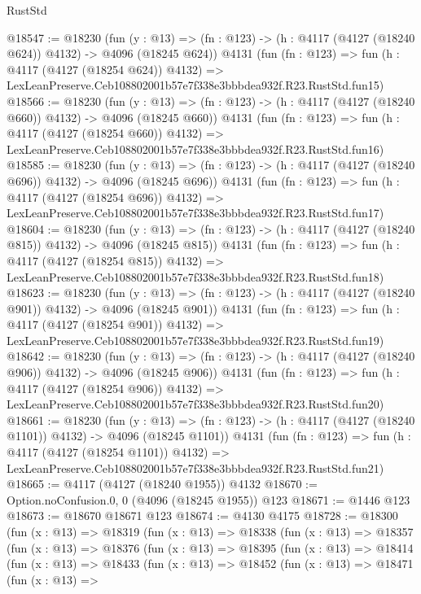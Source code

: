 \begin{lexlean}{RustStd}
\begin{coremodule}
@18547 := @18230
    (fun (y : @13) => (fn : @123) -> (h : @4117 (@4127 (@18240 @624)) @4132) -> @4096 (@18245 @624))
    @4131
    (fun (fn : @123) =>
    fun (h : @4117 (@4127 (@18254 @624)) @4132) =>
    LexLeanPreserve.Ceb108802001b57e7f338e3bbbdea932f.R23.RustStd.fun15)
@18566 := @18230
    (fun (y : @13) => (fn : @123) -> (h : @4117 (@4127 (@18240 @660)) @4132) -> @4096 (@18245 @660))
    @4131
    (fun (fn : @123) =>
    fun (h : @4117 (@4127 (@18254 @660)) @4132) =>
    LexLeanPreserve.Ceb108802001b57e7f338e3bbbdea932f.R23.RustStd.fun16)
@18585 := @18230
    (fun (y : @13) => (fn : @123) -> (h : @4117 (@4127 (@18240 @696)) @4132) -> @4096 (@18245 @696))
    @4131
    (fun (fn : @123) =>
    fun (h : @4117 (@4127 (@18254 @696)) @4132) =>
    LexLeanPreserve.Ceb108802001b57e7f338e3bbbdea932f.R23.RustStd.fun17)
@18604 := @18230
    (fun (y : @13) => (fn : @123) -> (h : @4117 (@4127 (@18240 @815)) @4132) -> @4096 (@18245 @815))
    @4131
    (fun (fn : @123) =>
    fun (h : @4117 (@4127 (@18254 @815)) @4132) =>
    LexLeanPreserve.Ceb108802001b57e7f338e3bbbdea932f.R23.RustStd.fun18)
@18623 := @18230
    (fun (y : @13) => (fn : @123) -> (h : @4117 (@4127 (@18240 @901)) @4132) -> @4096 (@18245 @901))
    @4131
    (fun (fn : @123) =>
    fun (h : @4117 (@4127 (@18254 @901)) @4132) =>
    LexLeanPreserve.Ceb108802001b57e7f338e3bbbdea932f.R23.RustStd.fun19)
@18642 := @18230
    (fun (y : @13) => (fn : @123) -> (h : @4117 (@4127 (@18240 @906)) @4132) -> @4096 (@18245 @906))
    @4131
    (fun (fn : @123) =>
    fun (h : @4117 (@4127 (@18254 @906)) @4132) =>
    LexLeanPreserve.Ceb108802001b57e7f338e3bbbdea932f.R23.RustStd.fun20)
@18661 := @18230
    (fun (y : @13) =>
    (fn : @123) -> (h : @4117 (@4127 (@18240 @1101)) @4132) -> @4096 (@18245 @1101))
    @4131
    (fun (fn : @123) =>
    fun (h : @4117 (@4127 (@18254 @1101)) @4132) =>
    LexLeanPreserve.Ceb108802001b57e7f338e3bbbdea932f.R23.RustStd.fun21)
@18665 := @4117 (@4127 (@18240 @1955)) @4132
@18670 := Option.noConfusion.{0, 0} (@4096 (@18245 @1955)) @123
@18671 := @1446 @123
@18673 := @18670 @18671 @123
@18674 := @4130 @4175
@18728 := @18300
    (fun (x : @13) =>
    @18319
      (fun (x : @13) =>
      @18338
        (fun (x : @13) =>
        @18357
          (fun (x : @13) =>
          @18376
            (fun (x : @13) =>
            @18395
              (fun (x : @13) =>
              @18414
                (fun (x : @13) =>
                @18433
                  (fun (x : @13) =>
                  @18452
                    (fun (x : @13) =>
                    @18471
                      (fun (x : @13) =>

\end{coremodule}
\end{lexlean}
